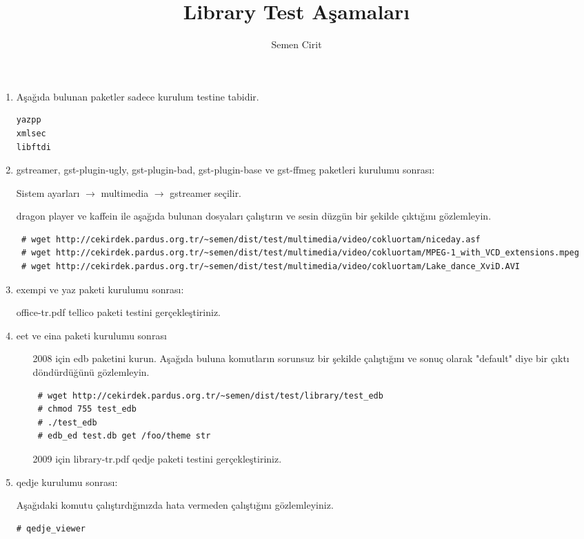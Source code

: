 \documentclass[a4paper,10pt]{article}
\title{Library Test Aşamaları}
\author{Semen Cirit}
\begin{document}
\maketitle
\begin{enumerate}
\item Aşağıda bulunan paketler sadece kurulum testine tabidir.
\begin{verbatim}
yazpp
xmlsec
libftdi
\end{verbatim}

\item gstreamer, gst-plugin-ugly, gst-plugin-bad, gst-plugin-base ve gst-ffmeg paketleri kurulumu sonrası:

Sistem ayarları $\rightarrow$ multimedia $\rightarrow$ gstreamer seçilir. 

dragon player ve kaffein ile aşağıda bulunan dosyaları çalıştırın ve sesin düzgün bir şekilde çıktığını gözlemleyin.
\begin{verbatim}
 # wget http://cekirdek.pardus.org.tr/~semen/dist/test/multimedia/video/cokluortam/niceday.asf
 # wget http://cekirdek.pardus.org.tr/~semen/dist/test/multimedia/video/cokluortam/MPEG-1_with_VCD_extensions.mpeg
 # wget http://cekirdek.pardus.org.tr/~semen/dist/test/multimedia/video/cokluortam/Lake_dance_XviD.AVI
\end{verbatim}

\item exempi ve yaz paketi kurulumu sonrası:

office-tr.pdf tellico paketi testini gerçekleştiriniz.

\item eet ve eina paketi kurulumu sonrası
\begin{itemize}
 \item [2008 için] edb paketini kurun. Aşağıda buluna komutların sorunsuz bir şekilde çalıştığını ve sonuç olarak "default" diye bir çıktı döndürdüğünü gözlemleyin.
\begin{verbatim}
 # wget http://cekirdek.pardus.org.tr/~semen/dist/test/library/test_edb
 # chmod 755 test_edb
 # ./test_edb
 # edb_ed test.db get /foo/theme str
\end{verbatim}
\item [2009 için] library-tr.pdf qedje paketi testini gerçekleştiriniz.
\end{itemize}

\item qedje kurulumu sonrası:

Aşağıdaki komutu çalıştırdığınızda hata vermeden çalıştığını gözlemleyiniz.
\begin{verbatim}
# qedje_viewer
\end{verbatim}


\end{enumerate}
\end{document}
